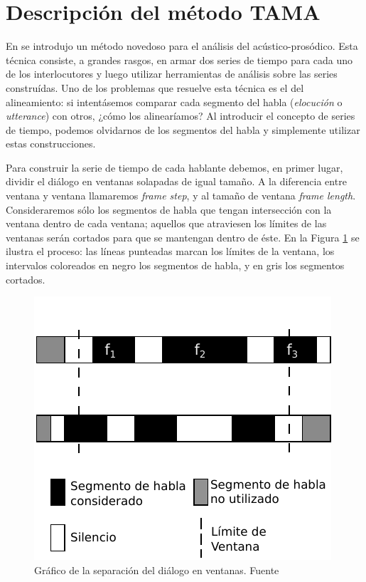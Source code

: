 \section{Descripción del método TAMA}
\label{sec:ant_tama}

En \cite{KOU2008} se introdujo un método novedoso para el análisis del \entrainment acústico-prosódico. Esta técnica consiste, a grandes rasgos, en armar dos series de tiempo para cada uno de los interlocutores y luego utilizar herramientas de análisis sobre las series construídas. Uno de los problemas que resuelve esta técnica es el del alineamiento: si intentásemos comparar cada segmento del habla (\emph{elocución} o \emph{utterance}) con otros, ¿cómo los alinearíamos? Al introducir el concepto de series de tiempo, podemos olvidarnos de los segmentos del habla y simplemente utilizar estas construcciones.

Para construir la serie de tiempo de cada hablante debemos, en primer lugar, dividir el diálogo en ventanas solapadas de igual tamaño. A la diferencia entre ventana y ventana llamaremos \emph{frame step}, y al tamaño de ventana \emph{frame length}. Consideraremos sólo los segmentos de habla que tengan intersección con la ventana dentro de cada ventana; aquellos que atraviesen los límites de las ventanas serán cortados para que se mantengan dentro de éste. En la Figura \ref{tama} se ilustra el proceso: las líneas punteadas marcan los límites de la ventana, los intervalos coloreados en negro los segmentos de habla, y en gris los segmentos cortados.

\begin{figure}[t]
\centering
  \includegraphics[scale=0.85]{images/tama_improved.pdf}
\caption{Gráfico de la separación del diálogo en ventanas. Fuente \cite{KOU2008.2}}
\label{tama}
\end{figure}

